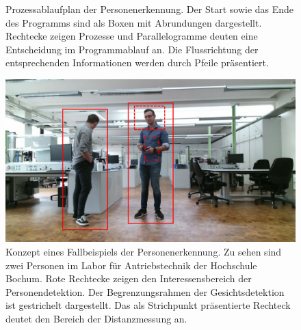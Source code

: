 \begin{figure}[H]
		\caption{Prozessablaufplan der Personenerkennung. Der Start sowie das Ende des Programms sind als Boxen mit Abrundungen dargestellt. Rechtecke zeigen Prozesse und Parallelogramme deuten eine Entscheidung im Programmablauf an. Die Flussrichtung der entsprechenden Informationen werden durch Pfeile präsentiert.}
		\label{fig: Personenerkennung}
	\end{figure}

	\begin{figure}[H]
		\centering
		\includegraphics[width=1\textwidth]{Bilder/person.pdf}
		\caption{Konzept eines Fallbeispiels der Personenerkennung. Zu sehen sind zwei Personen im Labor für Antriebstechnik der Hochschule Bochum. Rote Rechtecke zeigen den Interessensbereich der Personendetektion. Der Begrenzungsrahmen der Gesichtsdetektion ist gestrichelt dargestellt. Das als Strichpunkt präsentierte Rechteck deutet den Bereich der Distanzmessung an.}
		\label{fig: bbox}
	\end{figure}
	
